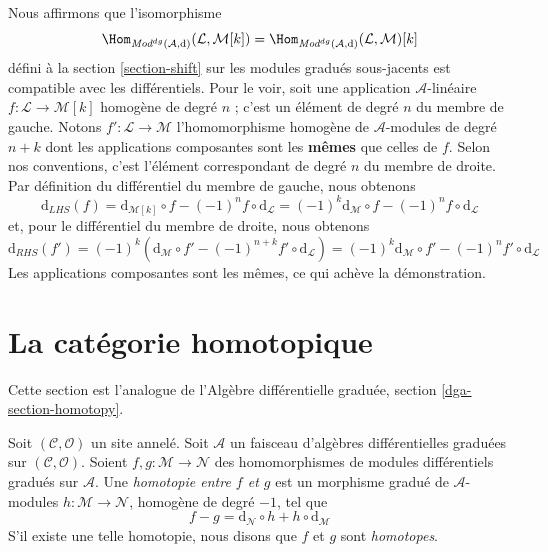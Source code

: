 \medskip\noindent
Nous affirmons que l'isomorphisme
$$
\Hom_{\textit{Mod}^{dg}(\mathcal{A}, \text{d})}(\mathcal{L}, \mathcal{M}[k])
=
\Hom_{\textit{Mod}^{dg}(\mathcal{A}, \text{d})}(\mathcal{L}, \mathcal{M})[k]
$$ défini à la
section \ref{section-shift} sur les modules gradués sous-jacents est
compatible avec les
différentiels. Pour le voir, soit une application $\mathcal{A}$-linéaire
$f : \mathcal{L} \to \mathcal{M}[k]$ homogène de degré $n$ ; c'est un élément de degré
$n$ du membre de gauche. Notons
$f' : \mathcal{L} \to \mathcal{M}$ l'homomorphisme homogène de $\mathcal{A}$-modules de degré
$n + k$ dont les applications composantes sont les {\bf mêmes} que celles de $f$.
Selon nos conventions, c'est l'élément correspondant de degré $n$ du membre
de droite.
Par définition du différentiel du membre de gauche, nous
obtenons $$
\text{d}_{LHS}(f)
= \text{d}_{\mathcal{M}[k]} \circ f - (-1)^n f \circ \text{d}_\mathcal{L}
= (-1)^k\text{d}_\mathcal{M} \circ f - (-1)^n f \circ \text{d}_\mathcal{L}
$$
et, pour le différentiel du membre de droite, nous
obtenons $$
\text{d}_{RHS}(f')
= (-1)^k\left(
\text{d}_\mathcal{M} \circ f' - (-1)^{n + k} f' \circ \text{d}_\mathcal{L}
\right)
= (-1)^k\text{d}_\mathcal{M} \circ f' - (-1)^n f' \circ \text{d}_\mathcal{L}
$$ Les
applications composantes sont les mêmes, ce qui achève la démonstration.










\section{La catégorie homotopique}
\label{section-homotopy}

\noindent
Cette section est l'analogue de
l'Algèbre différentielle graduée, section \ref{dga-section-homotopy}.

\begin{definition}
\label{definition-homotopy} Soit
$(\mathcal{C}, \mathcal{O})$ un site annelé. Soit
$\mathcal{A}$ un faisceau d'algèbres différentielles graduées sur
$(\mathcal{C}, \mathcal{O})$. Soient
$f, g : \mathcal{M} \to \mathcal{N}$ des
homomorphismes de modules différentiels gradués sur $\mathcal{A}$. Une
{\it homotopie entre $f$ et $g$} est un morphisme gradué de $\mathcal{A}$-modules
$h : \mathcal{M} \to \mathcal{N}$, homogène de degré $-1$, tel
que
$$ f - g
= \text{d}_\mathcal{N} \circ h + h \circ \text{d}_\mathcal{M}
$$ S'il existe
une telle homotopie, nous disons que $f$ et $g$ sont {\it homotopes}.
\end{definition}

